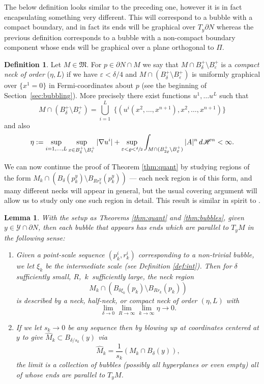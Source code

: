 \documentclass[10pt]{amsart}
\let\mathcal\mathscr
\newtheorem{lem}[thm]{Lemma}
\theoremstyle{definition}
\newtheorem{definition}[thm]{Definition}
\newcommand{\h}{\mathscr{H}}
\let\D\nabla
\let\eps\varepsilon
\begin{document}
The below definition looks similar to the preceding one, however it is in fact encapsulating something very different. This will correspond to a bubble with a compact boundary, and in fact its ends will be graphical over $T_y \partial N$ whereas the previous definition corresponds to a bubble with a non-compact boundary component whose ends will be graphical over a plane orthogonal to $\Pi$.

\begin{definition}\label{neckdef_c_boundary}
Let $M\in \mathfrak{M}$. For $p\in \partial N\cap M$ we say that $M\cap B^{+}_\delta\setminus B^{+}_{\eps}$ is a \emph{compact neck of order} ($\eta, L$) if we have $\eps < \delta/4$ and $M\cap (B_\delta^+\setminus B_{\eps}^+)$ is uniformly graphical over $\{x^{1}=0\}$ in Fermi-coordinates about $p$ (see the beginning of Section~\ref{sec:bubbling}). More precisely there exist functions $u^1,\dots u^L$ such that
\begin{equation*}
M\cap (B_\delta^+ \setminus B_{\eps}^+) = \bigcup_{i=1}^L \; \{(u^i(x^2,\dots,x^{n+1}),x^2,\dots ,x^{n+1})\}
\end{equation*}
and also
\begin{equation}
\eta:=\sup_{i=1,\ldots,L} \sup_{x\in B^+_\delta \setminus B^+_{\eps}} |\D u^i | + \sup_{\eps< \varrho < \sfrac{\delta}{2}} \int_{M \cap (B^+_{2\varrho}\setminus B^+_\varrho)} |A|^n \, d\h^n< \infty.
\end{equation}
\end{definition}

We can now continue the proof of Theorem \ref{thm:quant} by studying regions of the form $M_k\cap (B_{\delta}(p^y_k)\setminus B_{R r^y_k}(p^y_k))$ --- each neck region is of this form, and many different necks will appear in general, but the usual covering argument will allow us to study only one such region in detail. This result is similar in spirit to \cite[Th.\,1.1]{W15}.

\begin{lem}\label{lem:thm1}
With the setup as Theorems \ref{thm:quant} and \ref{thm:bubbles}, given $y\in \mathcal{Y}\cap\partial N$, then each bubble that appears has ends which are parallel to $T_y M$ in the following sense:
\begin{enumerate}
\item{Given a point-scale sequence $(p^i_k, r^i_k)$ corresponding to a non-trivial bubble, we let $\xi_k$ be the intermediate scale (see Definition \ref{def:int}).
Then for $\delta$ sufficiently small, $R$,~$k$~sufficiently large, the neck region $$M_k\cap (B_{\delta \xi_k}(p_k)\setminus B_{R r_k}(p_k))$$ is described by a neck, half-neck, or compact neck of order $(\eta, L)$ with
$$\lim_{\delta \to 0}\lim_{R\to \infty} \lim_{k\to \infty} \eta \to 0.$$}
\item{If we let $s_k\to 0$ be any sequence then by blowing up at coordinates centered at $y$ to give $\widehat{M}_k \subset B_{\delta/s_k}(y)$ via
$$\widehat{M}_k = \frac{1}{s_k}(M_k\cap B_{\delta}(y)),$$
the limit is a collection of bubbles (possibly all hyperplanes or even empty) all of whose ends are parallel to $T_y M$. }
\end{enumerate}
\end{lem}
\end{document}
